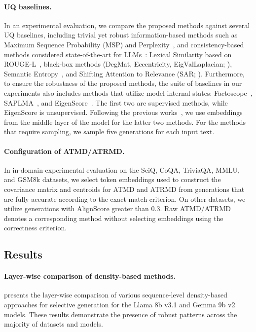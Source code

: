 \documentclass[11pt]{article}
\begin{document}
\paragraph{UQ baselines.}
  In an experimental evaluation, we compare the proposed methods against several UQ baselines, including trivial yet robust information-based methods such as Maximum Sequence Probability (MSP) and Perplexity~\cite{fomicheva-etal-2020-unsupervised}, and consistency-based methods considered state-of-the-art for LLMs~\cite{vashurin2024benchmakring}: Lexical Similarity based on ROUGE-L~\cite{fomicheva-etal-2020-unsupervised}, black-box methods (DegMat, Eccentricity, EigValLaplacian; \citet{lin2023generating}), Semantic Entropy~\cite{kuhn2023semantic}, and Shifting Attention to Relevance (SAR; \citet{duan-etal-2024-shifting}). Furthermore, to ensure the robustness of the proposed methods, the suite of baselines in our experiments also includes methods that utilize model internal states: Factoscope~\cite{he-etal-2024-llm}, SAPLMA~\cite{azaria-mitchell-2023-internal}, and EigenScore~\cite{chen2024eigenscore}. The first two are supervised methods, while EigenScore is unsupervised. Following the previous works~\cite{azaria-mitchell-2023-internal,chen2024eigenscore}, we use embeddings from the middle layer of the model for the latter two methods. For the methods that require sampling, we sample five generations for each input text.

\paragraph{Configuration of ATMD/ATRMD.}
  In in-domain experimental evaluation on the SciQ, CoQA, TriviaQA, MMLU, and GSM8k datasets, we select token embeddings used to construct the covariance matrix and centroids for ATMD and ATRMD from generations that are fully accurate according to the exact match criterion. On other datasets, we utilize generations with AlignScore greater than 0.3. Raw ATMD/ATRMD denotes a corresponding method without selecting embeddings using the correctness criterion.

\subsection{Results}
\paragraph{Layer-wise comparison of density-based methods.}
\label{sec:layer_wise_results}
   presents the layer-wise comparison of various sequence-level density-based approaches for selective generation for the Llama 8b v3.1 and Gemma 9b v2 models. These results demonstrate the presence of robust patterns across the majority of datasets and models. 
  
\end{document}
